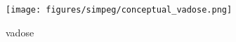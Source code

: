 \begin{figure}[!htbp]
\begin{center}
\texttt{[image: figures/simpeg/conceptual\_vadose.png]}
\end{center}
\caption{
vadose
}
\label{fig:simpeg-conceptual_vadose}
\end{figure}
